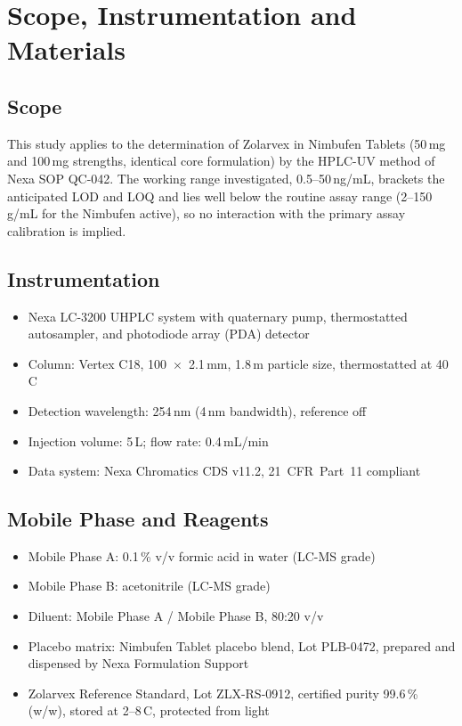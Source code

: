 
\section{Scope, Instrumentation and Materials}

\subsection{Scope}
This study applies to the determination of Zolarvex in Nimbufen Tablets (50\,mg and
100\,mg strengths, identical core formulation) by the HPLC-UV method of Nexa SOP
QC-042. The working range investigated, 0.5--50\,ng/mL, brackets the anticipated LOD
and LOQ and lies well below the routine assay range (2--150\,\textmu g/mL for the
Nimbufen active), so no interaction with the primary assay calibration is implied.

\subsection{Instrumentation}
\begin{itemize}[leftmargin=1.4em]
  \item Nexa LC-3200 UHPLC system with quaternary pump, thermostatted autosampler,
        and photodiode array (PDA) detector
  \item Column: Vertex C18, 100~$\times$~2.1\,mm, 1.8\,\textmu m particle size,
        thermostatted at 40\,\textdegree C
  \item Detection wavelength: 254\,nm (4\,nm bandwidth), reference off
  \item Injection volume: 5\,\textmu L; flow rate: 0.4\,mL/min
  \item Data system: Nexa Chromatics CDS v11.2, 21~CFR~Part~11 compliant
\end{itemize}

\subsection{Mobile Phase and Reagents}
\begin{itemize}[leftmargin=1.4em]
  \item Mobile Phase A: 0.1\,\% v/v formic acid in water (LC-MS grade)
  \item Mobile Phase B: acetonitrile (LC-MS grade)
  \item Diluent: Mobile Phase A / Mobile Phase B, 80:20 v/v
  \item Placebo matrix: Nimbufen Tablet placebo blend, Lot PLB-0472, prepared and
        dispensed by Nexa Formulation Support
  \item Zolarvex Reference Standard, Lot ZLX-RS-0912, certified purity 99.6\,\% (w/w),
        stored at 2--8\,\textdegree C, protected from light
\end{itemize}

